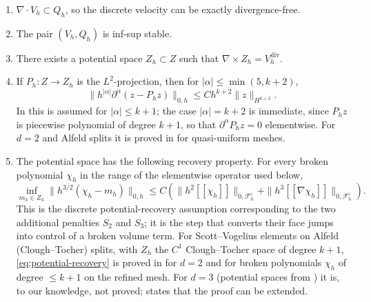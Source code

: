 \documentclass[11pt]{article}
\theoremstyle{remark}\newtheorem{remark}{Remark}
\newcommand{\Vh}{V_h}\newcommand{\Qh}{Q_h}
\newcommand{\Vdivh}{V_h^{\mathrm{div}}}
\newcommand{\Ph}{P_h}
\theoremstyle{plain}
\newcommand{\new}[1]{{\color{blue}#1}}
\begin{document}
\begin{enumerate}[label=\arabic*.,itemsep=1pt]
\item $\nabla\cdot\Vh\subset\Qh$, so the discrete velocity can be exactly divergence-free.
\item The pair $(\Vh,\Qh)$ is inf-sup stable.
\item There exists a potential space $Z_h\subset Z$ such that $\nabla\times Z_h=\Vdivh$.
\item If $\Ph:Z\to Z_h$ is the $L^2$-projection, then for $|\alpha|\le\min(5,k+2)$,
\[\|h^{|\alpha|}\partial^\alpha(z-\Ph z)\|_{0,h}\le Ch^{k+2}\|z\|_{H^{k+2}}.\]
In \cite{BBCG24,GAN25} this is assumed for $|\alpha|\le k+1$; \new{the case $|\alpha|=k+2$ is immediate, since $\Ph z$ is piecewise polynomial of degree $k+1$, so that $\partial^\alpha\Ph z=0$ elementwise.} For $d=2$ and Alfeld splits it is proved in \cite[Sec.~4]{BBCG24} for quasi-uniform meshes.
\item The potential space has the following recovery property. For every broken
polynomial $\chi_h$ in the range of the elementwise operator used below,
\begin{equation}\label{eq:potential-recovery}
\inf_{m_h\in Z_h}\|h^{3/2}(\chi_h-m_h)\|_{0,h}
\le C\left(\|h^2[\![\chi_h]\!]\|_{0,\mathcal F_h^i}
+\|h^3[\![\nabla\chi_h]\!]\|_{0,\mathcal F_h^i}\right).
\end{equation}
This is the discrete potential-recovery assumption corresponding to the two
additional penalties $S_2$ and $S_3$; it is the step that converts their face
jumps into control of a broken volume term.
For Scott--Vogelius elements on Alfeld (Clough--Tocher) splits, with $Z_h$ the $C^1$ Clough--Tocher space of degree $k+1$, \eqref{eq:potential-recovery} is proved in \cite[Lemma~4.1]{BBCG24} for $d=2$ and for broken polynomials $\chi_h$ of degree $\le k+1$ on the refined mesh. For $d=3$ (potential spaces from \cite{FGN20}) it is, to our knowledge, not proved; \cite[Sec.~6]{BBCG24} states that the proof can be extended.
\end{enumerate}
\end{document}
